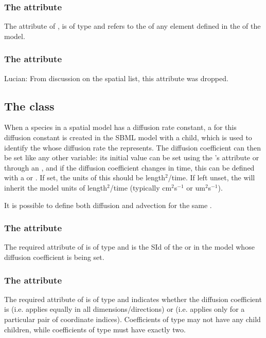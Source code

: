 \subsubsection{The  attribute}
The  attribute of \SpatialSymbolReference, is of type  and refers to the  of any element defined in the \Geometry of the model.

\subsubsection{The  attribute}
{\color{red} Lucian: \notice From discussion on the spatial list, this attribute was dropped.}

\subsection{The  class}
\label{DiffusionCoefficient-class}
When a species in a spatial model has a diffusion rate constant, a \Parameter for this diffusion constant is created in the SBML model with a \DiffusionCoefficient child, which is used to identify the \Species whose diffusion rate the \Parameter represents. The diffusion coefficient can then be set like any other variable:  its initial value can be set using the \Parameter's  attribute or through an \InitialAssignment, and if the diffusion coefficient changes in time, this can be defined with a \Rule or \Event. If set, the units of this \Parameter should be length$^2$/time.  If left unset, the \DiffusionCoefficient will inherit the model units of length$^2$/time (typically cm$^2$s$^{-1}$ or um$^2$s$^{-1}$).


It is possible to define both diffusion and advection for the same \Species.

\subsubsection{The  attribute}
The required  attribute of \DiffusionCoefficient is of type  and is the SId of the \Species or \Parameter in the model whose diffusion coefficient is being set.

\subsubsection{The  attribute}
The required  attribute of \DiffusionCoefficient is of type  and indicates whether the diffusion coefficient is  (i.e. applies equally in all dimensions/directions) or  (i.e. applies only for a particular pair of coordinate indices).  Coefficients of type  may not have any child \CoordinateIndex children, while coefficients of type  must have exactly two.


